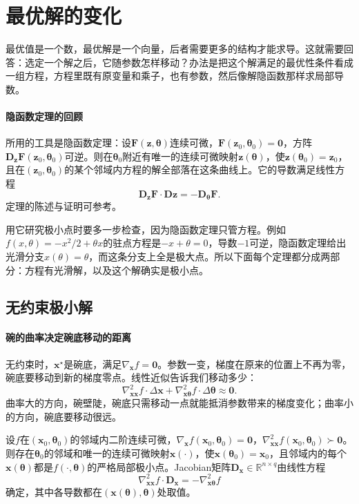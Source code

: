 \section{最优解的变化}
\label{sec:sens-solution}

最优值是一个数，最优解是一个向量，后者需要更多的结构才能求导。这就需要回答：选定一个解之后，它随参数怎样移动？办法是把这个解满足的最优性条件看成一组方程，方程里既有原变量和乘子，也有参数，然后像解隐函数那样求局部导数。

\paragraph{隐函数定理的回顾}
所用的工具是隐函数定理：设$\bm{F}(\bm{z},\bm{\theta})$连续可微，$\bm{F}(\bm{z}_0,\bm{\theta}_0)=\bm{0}$，方阵$\bm{D}_{\bm{z}}\bm{F}(\bm{z}_0,\bm{\theta}_0)$可逆。则在$\bm{\theta}_0$附近有唯一的连续可微映射$\bm{z}(\bm{\theta})$，使$\bm{z}(\bm{\theta}_0)=\bm{z}_0$，且在$(\bm{z}_0,\bm{\theta}_0)$的某个邻域内方程的解全部落在这条曲线上。它的导数满足线性方程
\[
 \bm{D}_{\bm{z}}\bm{F}\cdot\bm{D}\bm{z}=-\bm{D}_{\bm{\theta}}\bm{F}.
\]
定理的陈述与证明可参考。

用它研究极小点时要多一步检查，因为隐函数定理只管方程。例如$f(x,\theta)=-x^2/2+\theta x$的驻点方程是$-x+\theta=0$，导数$-1$可逆，隐函数定理给出光滑分支$x(\theta)=\theta$，而这条分支上全是极大点。所以下面每个定理都分成两部分：方程有光滑解，以及这个解确实是极小点。

\subsection{无约束极小解}
\label{sec:sens-unconstrained}

\paragraph{碗的曲率决定碗底移动的距离}
无约束时，$\bm{x}^\star$是碗底，满足$\nabla_{\bm{x}}f=\bm{0}$。参数一变，梯度在原来的位置上不再为零，碗底要移动到新的梯度零点。线性近似告诉我们移动多少：
\[
 \nabla^2_{\bm{x}\bm{x}}f\cdot\Delta\bm{x}+\nabla^2_{\bm{x}\bm{\theta}}f\cdot\Delta\bm{\theta}\approx\bm{0}.
\]
曲率大的方向，碗壁陡，碗底只需移动一点就能抵消参数带来的梯度变化；曲率小的方向，碗底要移动很远。

\begin{theorem}[无约束极小解的导数]
\label{thm:sens-unconstrained}
设$f$在$(\bm{x}_0,\bm{\theta}_0)$的邻域内二阶连续可微，$\nabla_{\bm{x}}f(\bm{x}_0,\bm{\theta}_0)=\bm{0}$，$\nabla^2_{\bm{x}\bm{x}}f(\bm{x}_0,\bm{\theta}_0)\succ\bm{0}$。则存在$\bm{\theta}_0$的邻域和唯一的连续可微映射$\bm{x}(\cdot)$，使$\bm{x}(\bm{\theta}_0)=\bm{x}_0$，且邻域内的每个$\bm{x}(\bm{\theta})$都是$f(\cdot,\bm{\theta})$的严格局部极小点。Jacobian矩阵$\bm{D}_{\bm{x}}\in\mathbb{R}^{n\times q}$由线性方程
\begin{equation}
 \nabla^2_{\bm{x}\bm{x}}f\cdot\bm{D}_{\bm{x}}=-\nabla^2_{\bm{x}\bm{\theta}}f
 \label{eq:sens-unconstrained-derivative}
\end{equation}
确定，其中各导数都在$(\bm{x}(\bm{\theta}),\bm{\theta})$处取值。
\end{theorem}

